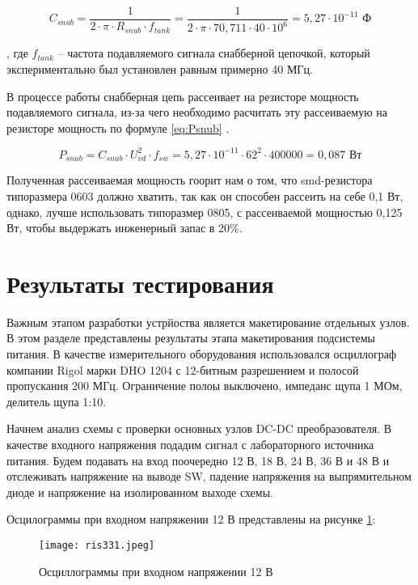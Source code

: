 \begin{equation}
    C_{snub} = \frac{1}{2 \cdot \pi \cdot R_{snub} \cdot f_{tank}} =
    \frac{1}{2 \cdot \pi \cdot 70,711 \cdot 40 \cdot 10^{6}} =
    5,27 \cdot 10^{-11} \text{ Ф}
    \label{eq:Csnub}
 \end{equation}

, где $f_{tank}$ -- частота подавляемого сигнала снабберной цепочкой, который экспериментально был установлен
равным примерно 40 МГц. 

В процессе работы снабберная цепь рассеивает на резисторе мощность подавляемого сигнала, из-за чего необходимо 
расчитать эту рассеиваемую на резисторе мощность по формуле \ref{eq:Psnub} \cite{Snubber:calculation}. 

\begin{equation}
P_{snub} = C_{snub} \cdot U_{vd}^{2} \cdot f_{sw} =  
5,27 \cdot 10^{-11} \cdot 62^{2} \cdot 400000 =
0,087 \text{ Вт}
\label{eq:Psnub}
\end{equation}

Полученная рассеиваемая мощность гоорит нам о том, что smd-резистора типоразмера 0603 должно хватить, так
как он способен рассеить на себе 0,1 Вт, однако, лучше использовать типоразмер 0805, с рассеиваемой 
мощностью 0,125 Вт, чтобы выдержать инженерный запас в 20\%. 

\section{Результаты тестирования}
\hspace{1cm} 

Важным этапом разработки устрйоства является макетирование отдельных узлов. В этом разделе представлены 
результаты этапа макетирования подсистемы питания. В качестве измерительного оборудования использовался 
осциллограф компании Rigol марки DHO 1204 с 12-битным разрешением и полосой пропускания 200 МГц. Ограничение 
полоы выключено, импеданс щупа 1 МОм, делитель щупа 1:10. 

Начнем анализ схемы с проверки основных узлов DC-DC преобразователя. В качестве входного напряжения подадим
сигнал с лабораторного источника питания. Будем подавать на вход поочередно 12 В, 18 В, 24 В, 36 В и 48 В и 
отслеживать напряжение на выводе SW, падение напряжения на выпрямительном диоде и напряжение на изолированном
выходе схемы. 

Осцилограммы при входном напряжении 12 В представлены на рисунке \ref{ris:331}:

\begin{figure}[H]
    \centering
    \texttt{[image: ris331.jpeg]}
    \caption{Осциллограммы при входном напряжении 12 В}
    \label{ris:331}
\end{figure}

